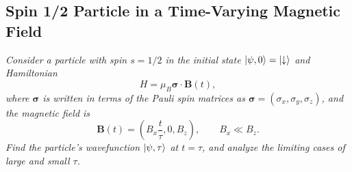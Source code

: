 \documentclass[11pt, a4paper]{article}
\newcommand{\Ham}{Hamiltonian\xspace}
\renewcommand{\vec}[1]{\bm{#1}} %
\newcommand{\p}{\psi}  %
\newcommand{\da}{\downarrow}  %
\begin{document}
\subsection{Spin 1/2 Particle in a Time-Varying Magnetic Field }
\textit{Consider a particle with spin $ s = 1/2 $ in the initial state $ \ket{\p, 0} = \ket{\da} $ and \Ham}
\begin{equation*}
	H = \mu_{B}\vec{\sigma}\cdot \vec{B}(t),
\end{equation*}
\textit{where $ \vec{\sigma} $ is written in terms of the Pauli spin matrices as $ \vec{\sigma} = (\sigma_{x}, \sigma_{y}, \sigma_{z}) $, and the magnetic field is}
\begin{equation*}
	\vec{B}(t) = \left(B_{x} \frac{t}{\tau}, 0, B_{z}\right), \qquad B_{x} \ll B_{z}.
\end{equation*}
\textit{Find the particle's wavefunction $ \ket{\p, \tau} $ at $ t = \tau $, and analyze the limiting cases of large and small $ \tau $.}
\end{document}
